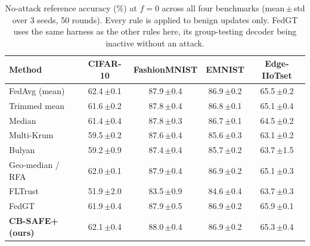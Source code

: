 \begin{table}[t]\centering\footnotesize
\caption{No-attack reference accuracy (\%) at $f{=}0$ across all four benchmarks (mean\,$\pm$\,std over 3 seeds, 50 rounds). Every rule is applied to benign updates only. FedGT uses the same harness as the other rules here, its group-testing decoder being inactive without an attack.}
\label{tab:noattack}
\begin{tabular}{@{}lcccc@{}}\toprule
Method & CIFAR-10 & FashionMNIST & EMNIST & Edge-IIoTset\\\midrule
FedAvg (mean)~\cite{mcmahan2017} & 62.4\,{\scriptsize$\pm$0.1} & 87.9\,{\scriptsize$\pm$0.4} & 86.9\,{\scriptsize$\pm$0.2} & 65.5\,{\scriptsize$\pm$0.2}\\
Trimmed mean~\cite{yin2018} & 61.6\,{\scriptsize$\pm$0.2} & 87.8\,{\scriptsize$\pm$0.4} & 86.8\,{\scriptsize$\pm$0.1} & 65.1\,{\scriptsize$\pm$0.4}\\
Median~\cite{yin2018} & 61.4\,{\scriptsize$\pm$0.4} & 87.8\,{\scriptsize$\pm$0.3} & 86.7\,{\scriptsize$\pm$0.1} & 64.5\,{\scriptsize$\pm$0.2}\\
Multi-Krum~\cite{blanchard2017} & 59.5\,{\scriptsize$\pm$0.2} & 87.6\,{\scriptsize$\pm$0.4} & 85.6\,{\scriptsize$\pm$0.3} & 63.1\,{\scriptsize$\pm$0.2}\\
Bulyan~\cite{bulyan} & 59.2\,{\scriptsize$\pm$0.9} & 87.4\,{\scriptsize$\pm$0.4} & 85.7\,{\scriptsize$\pm$0.2} & 63.7\,{\scriptsize$\pm$1.5}\\
Geo-median / RFA~\cite{rfa} & 62.0\,{\scriptsize$\pm$0.1} & 87.9\,{\scriptsize$\pm$0.4} & 86.9\,{\scriptsize$\pm$0.2} & 65.1\,{\scriptsize$\pm$0.3}\\
FLTrust~\cite{fltrust} & 51.9\,{\scriptsize$\pm$2.0} & 83.5\,{\scriptsize$\pm$0.9} & 84.6\,{\scriptsize$\pm$0.4} & 63.7\,{\scriptsize$\pm$0.3}\\
FedGT~\cite{fedgt} & 61.9\,{\scriptsize$\pm$0.4} & 87.9\,{\scriptsize$\pm$0.5} & 86.9\,{\scriptsize$\pm$0.2} & 65.9\,{\scriptsize$\pm$0.1}\\
\textbf{CB-SAFE+ (ours)} & 62.1\,{\scriptsize$\pm$0.4} & 88.0\,{\scriptsize$\pm$0.4} & 86.9\,{\scriptsize$\pm$0.2} & 65.3\,{\scriptsize$\pm$0.4}\\
\bottomrule\end{tabular}\end{table}
